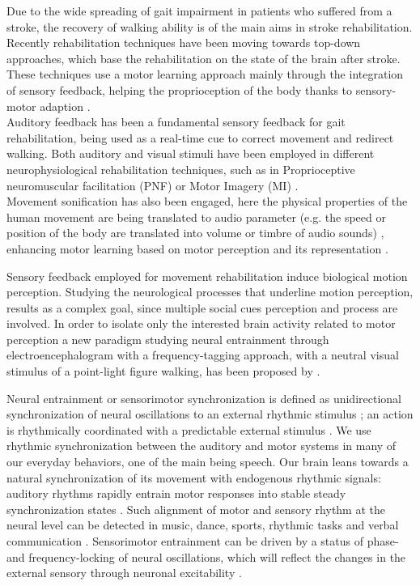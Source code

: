 Due to the wide spreading of gait impairment in patients who suffered from a stroke, the recovery of walking ability is of the main aims in stroke rehabilitation. Recently rehabilitation techniques have been moving towards top-down approaches, which base the rehabilitation on the state of the brain after stroke. These techniques use a motor learning approach mainly through the integration of sensory feedback, helping the proprioception of the body thanks to sensory-motor adaption \parencite{Belda-Lois_2011}. \\
Auditory feedback has been a fundamental sensory feedback for gait rehabilitation, being used as a real-time cue to correct movement and redirect walking. Both auditory and visual stimuli have been employed in different neurophysiological rehabilitation techniques, such as in Proprioceptive neuromuscular facilitation (PNF) \parencite{Moros_2000} or Motor Imagery (MI) \parencite{Mason_2007}. \\
Movement sonification has also been engaged, here the physical properties of the human movement are being translated to audio parameter (e.g. the speed or position of the body are translated into volume or timbre of audio sounds) \parencite{Effenberg_2016}, enhancing motor learning based on motor perception and its representation \parencite{Bevilacqua_2016}.

Sensory feedback employed for movement rehabilitation induce biological motion perception. Studying the neurological processes that underline motion perception, results as a complex goal, since multiple social cues perception and process are involved. In order to isolate only the interested brain activity related to motor perception a new paradigm studying neural entrainment through electroencephalogram with a frequency-tagging approach, with a neutral visual stimulus of a point-light figure walking, has been proposed by \cite{Cracco_2022}. 

Neural entrainment or sensorimotor synchronization is defined as unidirectional synchronization of neural oscillations to an external rhythmic stimulus \parencite{Lakatos_2019, Haegens_2018}; an action is rhythmically coordinated with a predictable external stimulus \parencite{Pressing_1999}. We use rhythmic synchronization between the auditory and motor systems in many of our everyday behaviors, one of the main being speech. Our brain leans towards a natural synchronization of its movement with endogenous rhythmic signals: auditory rhythms rapidly entrain motor responses into stable steady synchronization states \parencite{Thaut_2003}. Such alignment of motor and sensory rhythm at the neural level can be detected in music, dance, sports, rhythmic tasks and verbal communication \parencite{Rosso_2023}. Sensorimotor entrainment can be driven by a status of phase- and frequency-locking of neural oscillations, which will reflect the changes in the external sensory through neuronal excitability \parencite{Lakatos_2005}. 


